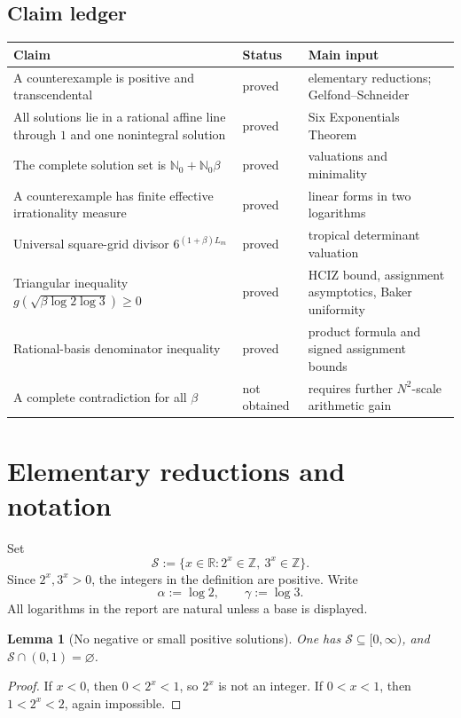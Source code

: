 \documentclass[11pt]{article}
\newtheorem{lemma}[theorem]{Lemma}
\theoremstyle{definition}
\newcommand{\Nzero}{\mathbb N_0}
\newcommand{\Z}{\mathbb Z}
\newcommand{\R}{\mathbb R}
\begin{document}
\subsection{Claim ledger}

\begin{center}
\begin{tabular}{p{}p{}p{}}
\toprule
Claim & Status & Main input \\
\midrule
A counterexample is positive and transcendental & proved & elementary reductions; Gelfond--Schneider \\
All solutions lie in a rational affine line through $1$ and one nonintegral solution & proved & Six Exponentials Theorem \\
The complete solution set is $\Nzero+\Nzero\beta$ & proved & valuations and minimality \\
A counterexample has finite effective irrationality measure & proved & linear forms in two logarithms \\
Universal square-grid divisor $6^{(1+\beta)L_m}$ & proved & tropical determinant valuation \\
Triangular inequality $g(\sqrt{\beta\log2\log3})\ge0$ & proved & HCIZ bound, assignment asymptotics, Baker uniformity \\
Rational-basis denominator inequality & proved & product formula and signed assignment bounds \\
A complete contradiction for all $\beta$ & not obtained & requires further $N^2$-scale arithmetic gain \\
\bottomrule
\end{tabular}
\end{center}

\section{Elementary reductions and notation}

Set
\[
  \mathcal S:=\{x\in\R:2^x\in\Z,\ 3^x\in\Z\}.
\]
Since $2^x,3^x>0$, the integers in the definition are positive.  Write
\[
  \alpha:=\log 2,\qquad \gamma:=\log 3.
\]
All logarithms in the report are natural unless a base is displayed.

\begin{lemma}[No negative or small positive solutions]\label{lem:range}
One has $\mathcal S\subseteq[0,\infty)$, and
$\mathcal S\cap(0,1)=\varnothing$.
\end{lemma}
\begin{proof}
If $x<0$, then $0<2^x<1$, so $2^x$ is not an integer.  If $0<x<1$, then
$1<2^x<2$, again impossible.
\end{proof}
\end{document}
